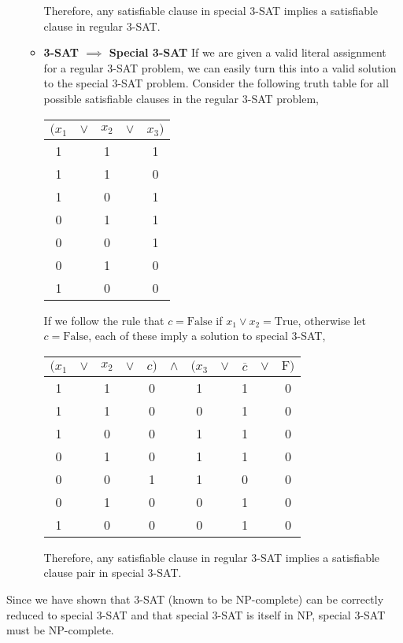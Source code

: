 \documentclass[12pt,twoside]{article}
\begin{document}
\begin{problems}
\begin{problemparts}
\begin{itemize}
\begin{itemize}
    Therefore, any satisfiable clause in special 3-SAT implies a satisfiable
    clause in regular 3-SAT.

    \item {\bf 3-SAT $\implies$ Special 3-SAT} If we are given a valid
    literal assignment for a regular 3-SAT problem, we can easily turn this
    into a valid solution to the special 3-SAT problem. Consider the
    following truth table for all possible satisfiable clauses in the regular
    3-SAT problem,
    
    \begin{center}
      \begin{tabular}{c c c c c}
        $(x_1$ & $\lor$ & $x_2$ & $\lor$ & $x_3)$ \\
        \hline \hline
        1 && 1 && 1 \\
        1 && 1 && 0 \\
        1 && 0 && 1 \\
        0 && 1 && 1 \\
        0 && 0 && 1 \\
        0 && 1 && 0 \\
        1 && 0 && 0
      \end{tabular}
    \end{center}

    If we follow the rule that $c = \mathrm{False}$ if $x_1 \lor x_2 =
    \mathrm{True}$, otherwise let $c = \mathrm{False}$, each of these imply a
    solution to special 3-SAT,

    \begin{center}
      \begin{tabular}{c c c c c c c c c c c}
        $(x_1$ & $\lor$ & $x_2$ & $\lor$ & $c)$ & $\land$ & $(x_3$ & $\lor$ &
        $\overline{c}$ & $\lor$ & $\mathrm{F})$ \\
        \hline \hline
        1 && 1 && 0 && 1 && 1 && 0\\
        1 && 1 && 0 && 0 && 1 && 0\\
        1 && 0 && 0 && 1 && 1 && 0\\
        0 && 1 && 0 && 1 && 1 && 0\\
        0 && 0 && 1 && 1 && 0 && 0\\
        0 && 1 && 0 && 0 && 1 && 0\\
        1 && 0 && 0 && 0 && 1 && 0
      \end{tabular}
    \end{center}

    Therefore, any satisfiable clause in regular 3-SAT implies a satisfiable
    clause pair in special 3-SAT.
    
  \end{itemize}

\end{itemize}

Since we have shown that 3-SAT (known to be NP-complete) can be correctly
reduced to special 3-SAT and that special 3-SAT is itself in NP, special
3-SAT must be NP-complete.

\end{problemparts}

\end{problems}
\end{document}
